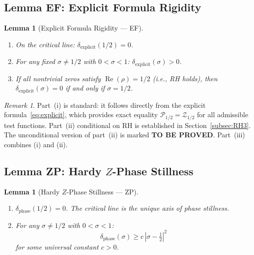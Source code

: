 \documentclass[11pt]{article}
\newtheorem{lemma}[theorem]{Lemma}
\theoremstyle{remark}
\newtheorem{remark}[theorem]{Remark}
\DeclareMathOperator{\Rea}{Re}
\begin{document}
\subsection{Lemma EF: Explicit Formula Rigidity}

\begin{lemma}[Explicit Formula Rigidity --- EF]
\label{lem:EF}
\hfill
\begin{enumerate}
  \item[(i)] On the critical line:
    $\delta_{\mathrm{explicit}}(1/2) = 0$.
  \item[(ii)] For any fixed $\sigma\neq 1/2$ with $0<\sigma<1$:
    $\delta_{\mathrm{explicit}}(\sigma) > 0$.
  \item[(iii)] If all nontrivial zeros satisfy $\Rea(\rho)=1/2$ (i.e., RH holds), then
    $\delta_{\mathrm{explicit}}(\sigma)=0$ if and only if $\sigma=1/2$.
\end{enumerate}
\end{lemma}

\begin{remark}
Part~(i) is standard: it follows directly from the explicit formula~\eqref{eq:explicit},
which provides exact equality $\mathcal{P}_{1/2}=\mathcal{Z}_{1/2}$ for all admissible
test functions.
Part~(ii) conditional on RH is established in Section~\ref{subsec:RH3}.
The unconditional version of part~(ii) is marked \textbf{TO BE PROVED}.
Part~(iii) combines (i) and (ii).
\end{remark}

\subsection{Lemma ZP: Hardy $Z$-Phase Stillness}

\begin{lemma}[Hardy $Z$-Phase Stillness --- ZP]
\label{lem:ZP}
\hfill
\begin{enumerate}
  \item[(i)] $\delta_{\mathrm{phase}}(1/2)=0$.
    The critical line is the unique axis of phase stillness.
  \item[(ii)] For any $\sigma\neq 1/2$ with $0<\sigma<1$:
    \begin{equation}\label{eq:phase-lower}
      \delta_{\mathrm{phase}}(\sigma) \geq c\,|\sigma-\tfrac{1}{2}|^2
    \end{equation}
    for some universal constant $c>0$.
\end{enumerate}
\end{lemma}
\end{document}
